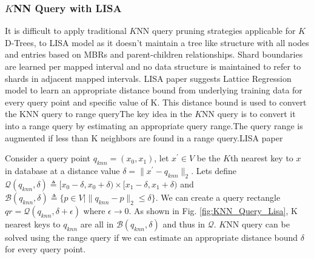 \subsubsection{$K$NN Query with LISA}
It is difficult to apply traditional $K$NN query pruning strategies applicable for $K$D-Trees, to LISA model as it doesn't maintain a tree like structure with all nodes and
entries based on MBRs and parent-children relationships. Shard boundaries are learned per mapped interval and no data structure is maintained to refer to shards in adjacent mapped intervals. LISA paper suggests Lattice Regression model to learn an appropriate distance bound from underlying training data for every query point and specific value of K. This distance bound is used to convert the KNN query to range queryThe key idea in the $K$NN query is to convert it into a range query by estimating an appropriate query range.The query range is augmented if less than K neighbors are found in a range query.LISA paper 

Consider a query point $q_{knn}=(x_{0},x_{1})$, let $x^{'} \in V$ be the $K$th nearest key to $x$ in database at a distance value $\delta = \| x^{'}-q_{knn}\|_{2} $. Lets define $ \mathcal{Q}(q_{knn},\delta) \triangleq [x_{0}-\delta, x_{0}+\delta) \times[x_{1}-\delta, x_{1}+\delta)$ and $\mathcal{B}(q_{knn}, \delta)  \triangleq \{p \in V \mid \| q_{knn}-p\|_{2} \leq \delta \} $. We can create a query rectangle $qr =  \mathcal{Q}(q_{knn}, \delta + \epsilon)$ where $\epsilon \rightarrow 0$. As shown in Fig. \ref{fig:KNN_Query_Lisa}, K nearest keys to $q_{knn}$ are all in $\mathcal{B}(q_{knn}, \delta)$ and thus in $\mathcal{Q}$. $K$NN query can be solved using the range query if we can estimate an appropriate distance bound $\delta$ for every query point.

